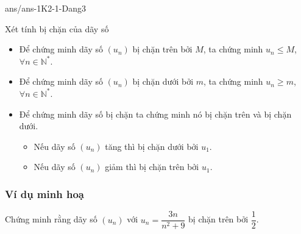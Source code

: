 \begin{indapan}{10}
	{ans/ans-1K2-1-Dang3}
\end{indapan}

\begin{dang}{Xét tính bị chặn của dãy số}
	\begin{itemize}
		\item Để chứng minh dãy số $(u_n)$ bị chặn trên bởi $M$, ta chứng minh $u_n\le M$, $\forall n\in\mathbb{N}^\ast$.
		\item Để chứng minh dãy số $(u_n)$ bị chặn dưới bởi $m$, ta chứng minh $u_n\ge m$, $\forall n\in\mathbb{N}^\ast$.
		\item Để chứng minh dãy số bị chặn ta chứng minh nó bị chặn trên và bị chặn dưới.
		\begin{itemize}
			\item Nếu dãy số $(u_n)$ tăng thì bị chặn dưới bởi $u_1$.
			\item Nếu dãy số $(u_n)$ giảm thì bị chặn trên bởi $u_1$.
		\end{itemize}
	\end{itemize}
\end{dang}
\subsubsection{Ví dụ minh hoạ}

\begin{vd}[NB]%
	Chứng minh rằng dãy số $(u_n)$ với $u_n=\dfrac{3n}{n^2+9}$ bị chặn trên bởi $\dfrac{1}{2}$.
\end{vd}

